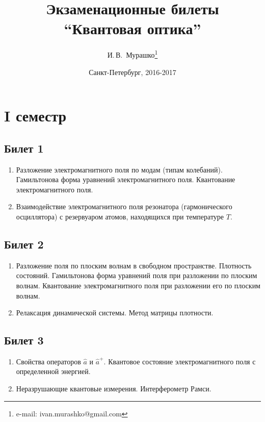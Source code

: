\documentclass[12pt,a4paper]{article}
\begin{document}
\Russian

\title{Экзаменационные билеты \\ ``Квантовая оптика''}
\author{И.\,В.~Мурашко\thanks{e-mail: ivan.murashko@gmail.com}}
\date{Санкт-Петербург, 2016-2017}
\maketitle
\newpage


\section*{I семестр}

\subsection*{Билет 1} 
\begin{enumerate}
\item Разложение электромагнитного поля по модам (типам колебаний).
Гамильтонова форма уравнений электромагнитного поля. Квантование
электромагнитного поля. 
\item Взаимодействие электромагнитного поля резонатора
  (гармонического осциллятора) с резервуаром атомов, находящихся при
  температуре $T$. 
\end{enumerate}

\subsection*{Билет 2} 
\begin{enumerate}
\item Разложение поля по плоским волнам в свободном пространстве. 
Плотность состояний. Гамильтонова форма уравнений поля при разложении по плоским
волнам. Квантование электромагнитного поля при разложении его по
плоским волнам.
\item Релаксация динамической системы. Метод матрицы плотности. 
\end{enumerate}

\subsection*{Билет 3} 
\begin{enumerate}
\item Свойства операторов $ \hat a $ и $ \hat a ^+ $. Квантовое
состояние электромагнитного поля  с определенной энергией. 
\item Неразрушающие квантовые измерения. Интерферометр Рамси. 
\end{enumerate}
\end{document}
